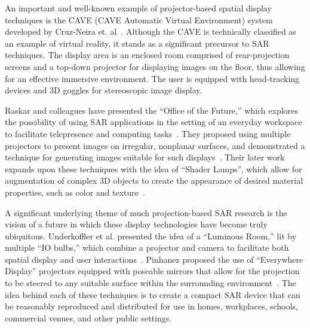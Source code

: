 \documentclass{thesis}
\begin{document}
An important and well-known example of projector-based spatial display techniques is the CAVE (CAVE Automatic Virtual Environment) system developed by Cruz-Neira et. al~\cite{Cruz-Neira1993}. Although the CAVE is technically classified as an example of virtual reality, it stands as a significant precursor to SAR techniques. The display area is an enclosed room comprised of rear-projection screens and a top-down projector for displaying images on the floor, thus allowing for an effective immersive environment. The user is equipped with head-tracking devices and 3D goggles for stereoscopic image display.

Raskar and colleagues have presented the ``Office of the Future,'' which explores the possibility of using SAR applications in the setting of an everyday workspace to facilitate telepresence and computing tasks~\cite{Raskar1998a}. They proposed using multiple projectors to present images on irregular, nonplanar surfaces, and demonstrated a technique for generating images suitable for such displays~\cite{Raskar1998b}. Their later work expands upon these techniques with the idea of ``Shader Lamps'', which allow for augmentation of complex 3D objects to create the appearance of desired material properties, such as color and texture~\cite{Raskar2000}. 

A significant underlying theme of much projection-based SAR research is the vision of a future in which these display technologies have become truly ubiquitous. Underkoffler et al. presented the idea of a ``Luminous Room,'' lit by multiple ``IO bulbs,'' which combine a projector and camera to facilitate both spatial display and user interactions~\cite{Underkoffler1999}. Pinhanez proposed the use of ``Everywhere Display'' projectors equipped with poseable mirrors that allow for the projection to be steered to any suitable surface within the surrounding environment~\cite{Pinhanez2001}. The idea behind each of these techniques is to create a compact SAR device that can be reasonably reproduced and distributed for use in homes, workplaces, schools, commercial venues, and other public settings.
\end{document}
